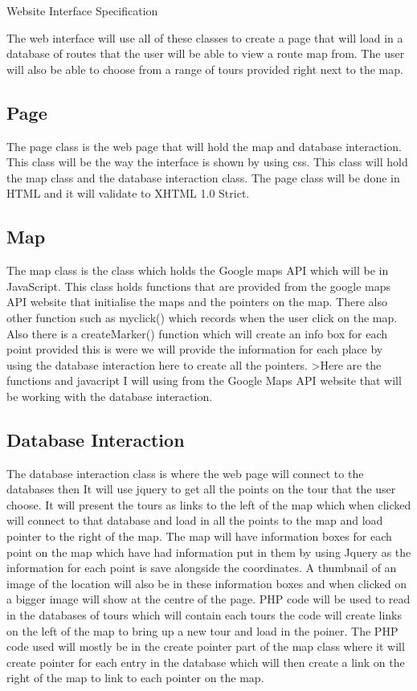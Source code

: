 \documentclass{article}
\begin{document}
	\begin{section}{Website Interface Specification}

The web interface will use all of these classes to create a page that will load in a database of routes that the user will be able to view a route map from. The user will also be able to choose from a range of tours provided right next to the map. 

\subsection{Page}
The page class is the web page that will hold the map and database interaction. This class will be the way the interface is shown by using css. This class will hold the map class and the database interaction class. The page class will be done in HTML and it will validate to XHTML 1.0 Strict. 

\subsection{Map}
The map class is the class which holds the Google maps API which will be in JavaScript. This class holds functions that are provided from the google maps API website that initialise the maps and the pointers on the map. There also other function such as myclick() which records when the user click on the map. Also there is a createMarker() function which will create an info box for each point provided this is were we will provide the information for each place by using the database interaction here to create all the pointers.
>Here are the functions and javacript I will using from the Google Maps API website that will be working with the database interaction.

\subsection{Database Interaction}
The database interaction class is where the web page will connect to the databases then It will use jquery to get all the points on the tour that the user choose. It will present the tours as links to the left of the map which when clicked will connect to that database and load in all the points to the map and load pointer to the right of the map. The map will have information boxes for each point on the map which have had information put in them by using Jquery as the information for each point is save alongside the coordinates. A thumbnail of an image of the location will also be in these information boxes and when clicked on a bigger image will show at the centre of the page. PHP code will be used to read in the databases of tours which will contain each tours the code will create links on the left of the map to bring up a new tour and load in the poiner. The PHP code used  will mostly be in the create pointer part of the map class where it will create pointer for each entry in the database which will then create a link on the right of the map to link to each pointer on the map.


\end{section}
\end{document}
